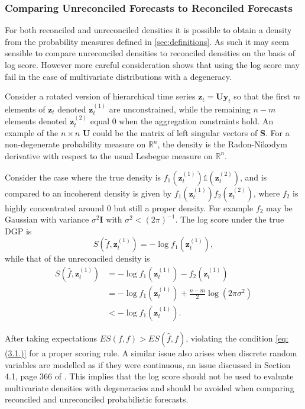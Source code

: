 \documentclass[a4paper, 11pt]{article}
\theoremstyle{theo}
\theoremstyle{definition}
\begin{document}
\subsubsection{Comparing Unreconciled Forecasts to Reconciled Forecasts}


For both reconciled and unreconciled densities it is possible to obtain a density from the probability measures defined in \ref{sec:definitions}.  As such it may seem sensible to compare unreconciled densities to reconciled densities on the basis of log score.  However more careful consideration shows that using the log score may fail in the case of multivariate distributions with a degeneracy.

Consider a rotated version of hierarchical time series $\bm{z}_t={\bm U}{\bm y}_t$ so that the first $m$ elements of $\bm{z}_t$ denoted $\bm{z}^{(1)}_t$ are unconstrained, while the remaining $n-m$ elements denoted $\bm{z}^{(2)}_t$ equal $0$ when the aggregation constraints hold. An example of the $n\times n$ ${\bm U}$ could be the matrix of left singular vectors of ${\bm S}$.  For a non-degenerate probability measure on $\mathbb{R}^n$, the density is the Radon-Nikodym derivative with respect to the usual Lesbegue measure on $\mathbb{R}^n$.  %

Consider the case where the true density is $f_1(\bm{z}^{(1)}_t)\mathbb{1}\left({\bm{z}^{(2)}_t}\right)$, and is compared to an incoherent density is given by $f_1(\bm{z}^{(1)}_t)f_2(\bm{z}^{(2)}_t)$, where $f_2$ is highly concentrated around $0$ but still a proper density. For example $f_2$ may be Gaussian with variance $\sigma^2{\bm I}$ with $\sigma^2 < (2\pi)^{-1}$. The log score under the true DGP is
$$
S\left(\tilde{f},\bm{z}^{(1)}_t\right) = -\log f_1\left(\bm{z}^{(1)}_t\right),
$$
while that of the unreconciled density is
\begin{align}
S\left(\hat{f},\bm{z}^{(1)}_t\right) &= -\log f_1(\bm{z}^{(1)}_t)-f_2(\bm{z}^{(1)}_t)\\
&= -\log f_1(\bm{z}^{(1)}_t)+\frac{n-m}{2}\log(2\pi\sigma^2)\\
&<-\log f_1(\bm{z}^{(1)}_t).
\end{align}


After taking expectations $ES(f,f) > ES(\hat{f},f)$, violating the condition \eqref{eq:(3.1.)} for a proper scoring rule.  A similar issue also arises when discrete random variables are modelled as if they were continuous, an issue discussed in Section 4.1, page 366 of \cite{Gneiting2007}. This implies that the log score should not be used to evaluate multivariate densities with degeneracies and should be avoided when comparing reconciled and unreconciled probabilistic forecasts.
\end{document}
